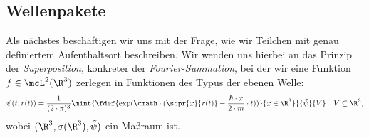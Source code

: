 \documentclass{article}
\begin{document}
    \subsection*{Wellenpakete}
        Als nächstes beschäftigen wir uns mit der Frage, wie wir Teilchen mit genau definiertem Aufenthaltsort beschreiben. Wir wenden uns hierbei an das Prinzip der \emph{Superposition}, konkreter der \emph{Fourier-Summation}, bei der wir eine Funktion $f\in \mcL^2(\R^3)$ zerlegen in Funktionen des Typus der ebenen Welle:
        \[\psi(t,r(t)) = \frac{1}{(2\cdot\pi)^3}\mint{\fdef{\exp(\cmath\cdot(\scpr{x}{r(t)} - \frac{\hbar\cdot x}{2\cdot m}\cdot t))}{x\in\R^3}}{\tilde\psi}{V}\quad V\subseteq\R^3,\]
        wobei $(\R^3,\sigma(\R^3),\tilde\psi)$ ein Maßraum ist. 
\end{document}
